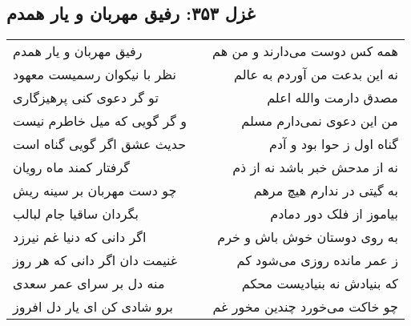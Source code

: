 \begin{center}
\section*{غزل ۳۵۳: رفیق مهربان و یار همدم}
\label{sec:353}
\begin{longtable}{l p{0.5cm} r}
رفیق مهربان و یار همدم
&&
همه کس دوست می‌دارند و من هم
\\
نظر با نیکوان رسمیست معهود
&&
نه این بدعت من آوردم به عالم
\\
تو گر دعوی کنی پرهیزگاری
&&
مصدق دارمت والله اعلم
\\
و گر گویی که میل خاطرم نیست
&&
من این دعوی نمی‌دارم مسلم
\\
حدیث عشق اگر گویی گناه است
&&
گناه اول ز حوا بود و آدم
\\
گرفتار کمند ماه رویان
&&
نه از مدحش خبر باشد نه از ذم
\\
چو دست مهربان بر سینه ریش
&&
به گیتی در ندارم هیچ مرهم
\\
بگردان ساقیا جام لبالب
&&
بیاموز از فلک دور دمادم
\\
اگر دانی که دنیا غم نیرزد
&&
به روی دوستان خوش باش و خرم
\\
غنیمت دان اگر دانی که هر روز
&&
ز عمر مانده روزی می‌شود کم
\\
منه دل بر سرای عمر سعدی
&&
که بنیادش نه بنیادیست محکم
\\
برو شادی کن ای یار دل افروز
&&
چو خاکت می‌خورد چندین مخور غم
\\
\end{longtable}
\end{center}
